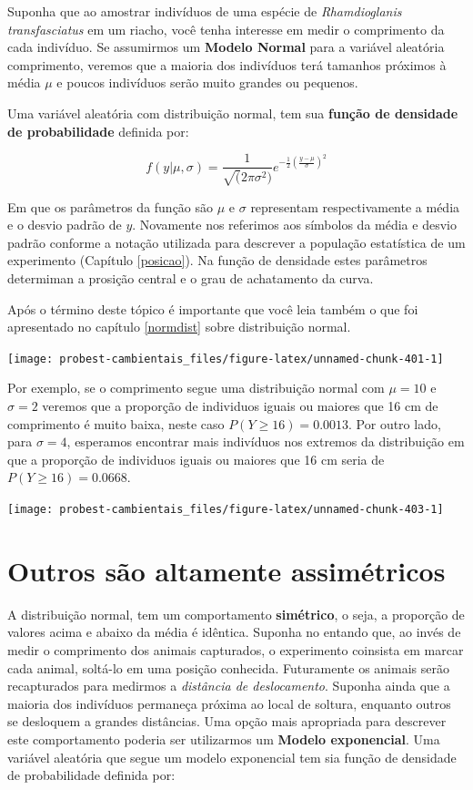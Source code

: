 \documentclass[
]{book}
\begin{document}
Suponha que ao amostrar indivíduos de uma espécie de \emph{Rhamdioglanis transfasciatus} em um riacho, você tenha interesse em medir o comprimento da cada indivíduo. Se assumirmos um \textbf{Modelo Normal} para a variável aleatória comprimento, veremos que a maioria dos indivíduos terá tamanhos próximos à média \(\mu\) e poucos indivíduos serão muito grandes ou pequenos.

Uma variável aleatória com distribuição normal, tem sua \textbf{função de densidade de probabilidade} definida por:

\[f(y|\mu,\sigma) = \frac{1}{\sqrt(2\pi\sigma^2)}e^{-\frac{1}{2}(\frac{y-\mu}{\sigma})^2}\]

Em que os parâmetros da função são \(\mu\) e \(\sigma\) representam respectivamente a média e o desvio padrão de \(y\). Novamente nos referimos aos símbolos da média e desvio padrão conforme a notação utilizada para descrever a população estatística de um experimento (Capítulo \ref{posicao}). Na função de densidade estes parâmetros determiman a prosição central e o grau de achatamento da curva.

Após o término deste tópico é importante que você leia também o que foi apresentado no capítulo \ref{normdist} sobre distribuição normal.

\begin{center}\texttt{[image: probest-cambientais\_files/figure-latex/unnamed-chunk-401-1]} \end{center}

Por exemplo, se o comprimento segue uma distribuição normal com \(\mu = 10\) e \(\sigma = 2\) veremos que a proporção de individuos iguais ou maiores que 16 cm de comprimento é muito baixa, neste caso \(P(Y \ge 16) = 0.0013\). Por outro lado, para \(\sigma = 4\), esperamos encontrar mais indivíduos nos extremos da distribuição em que a proporção de individuos iguais ou maiores que 16 cm seria de \(P(Y \ge 16) = 0.0668\).

\begin{center}\texttt{[image: probest-cambientais\_files/figure-latex/unnamed-chunk-403-1]} \end{center}

\hypertarget{outros-suxe3o-altamente-assimuxe9tricos}{%
\section{Outros são altamente assimétricos}\label{outros-suxe3o-altamente-assimuxe9tricos}}

A distribuição normal, tem um comportamento \textbf{simétrico}, o seja, a proporção de valores acima e abaixo da média é idêntica. Suponha no entando que, ao invés de medir o comprimento dos animais capturados, o experimento coinsista em marcar cada animal, soltá-lo em uma posição conhecida. Futuramente os animais serão recapturados para medirmos a \emph{distância de deslocamento}. Suponha ainda que a maioria dos indivíduos permaneça próxima ao local de soltura, enquanto outros se desloquem a grandes distâncias. Uma opção mais apropriada para descrever este comportamento poderia ser utilizarmos um \textbf{Modelo exponencial}. Uma variável aleatória que segue um modelo exponencial tem sia função de densidade de probabilidade definida por:
\end{document}
